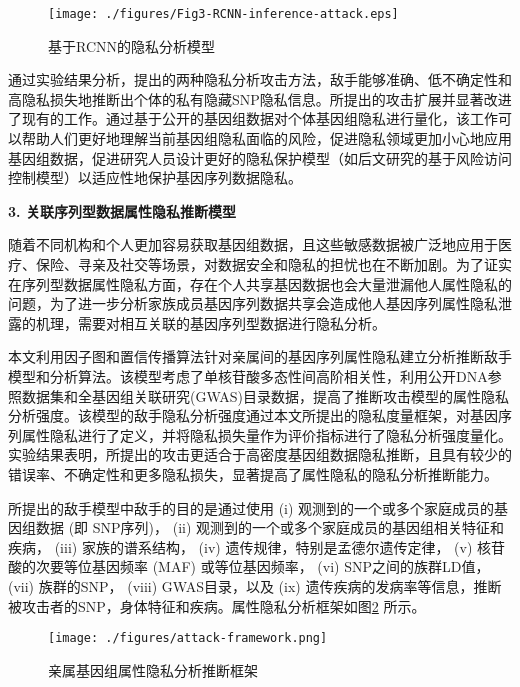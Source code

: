\documentclass[pdftex,notypeinfo,twoside,openany,UTF8,fntef]{CASthesis}
\theoremstyle{THrm}{
	\newtheorem{question}{Question}[section]
	\newtheorem{property}{性质}[section]
	\newtheorem{assumption}{假设}[section]
	\newtheorem{claim}[lemma]{断言}
	
}
\begin{document}
\begin{figure}[htbp]
	\centering
	\texttt{[image: ./figures/Fig3-RCNN-inference-attack.eps]}\\
	\caption{基于RCNN的隐私分析模型}
	\label{fig:rcnn_infer}
\end{figure}

通过实验结果分析，提出的两种隐私分析攻击方法，敌手能够准确、低不确定性和高隐私损失地推断出个体的私有隐藏SNP隐私信息。所提出的攻击扩展并显著改进了现有的工作。通过基于公开的基因组数据对个体基因组隐私进行量化，该工作可以帮助人们更好地理解当前基因组隐私面临的风险，促进隐私领域更加小心地应用基因组数据，促进研究人员设计更好的隐私保护模型（如后文研究的基于风险访问控制模型）以适应性地保护基因序列数据隐私。

\textbf{3.	关联序列型数据属性隐私推断模型}

随着不同机构和个人更加容易获取基因组数据，且这些敏感数据被广泛地应用于医疗、保险、寻亲及社交等场景，对数据安全和隐私的担忧也在不断加剧。为了证实在序列型数据属性隐私方面，存在个人共享基因数据也会大量泄漏他人属性隐私的问题，为了进一步分析家族成员基因序列数据共享会造成他人基因序列属性隐私泄露的机理，需要对相互关联的基因序列型数据进行隐私分析。

本文利用因子图和置信传播算法针对亲属间的基因序列属性隐私建立分析推断敌手模型和分析算法。该模型考虑了单核苷酸多态性间高阶相关性，利用公开DNA参照数据集和全基因组关联研究(GWAS)目录数据，提高了推断攻击模型的属性隐私分析强度。该模型的敌手隐私分析强度通过本文所提出的隐私度量框架，对基因序列属性隐私进行了定义，并将隐私损失量作为评价指标进行了隐私分析强度量化。实验结果表明，所提出的攻击更适合于高密度基因组数据隐私推断，且具有较少的错误率、不确定性和更多隐私损失，显著提高了属性隐私的隐私分析推断能力。

所提出的敌手模型中敌手的目的是通过使用 (i) 观测到的一个或多个家庭成员的基因组数据 (即 SNP序列)，  (ii) 观测到的一个或多个家庭成员的基因组相关特征和疾病， (iii) 家族的谱系结构， (iv) 遗传规律，特别是孟德尔遗传定律， (v) 核苷酸的次要等位基因频率 (MAF) 或等位基因频率， (vi) SNP之间的族群LD值， (vii) 族群的SNP， (viii) GWAS目录，以及 (ix) 遗传疾病的发病率等信息，推断被攻击者的SNP，身体特征和疾病。属性隐私分析框架如图\ref{fig:attack-framework} 所示。
\begin{figure}[htbp]
	\centering
	\texttt{[image: ./figures/attack-framework.png]}
	\centering
	\caption{亲属基因组属性隐私分析推断框架}\label{fig:attack-framework}
\end{figure}
\end{document}

